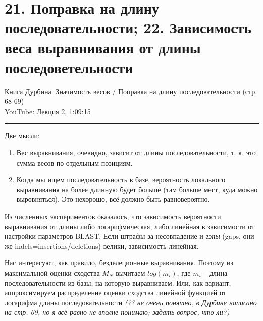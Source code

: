 \documentclass[a4paper,12pt]{article} %
\begin{document}
\section{21. Поправка на длину последовательности; 22. Зависимость веса выравнивания от длины последоветельности}
Книга Дурбина.  Значимость весов / Поправка на длину последовательности (стр. 68-69) \\
YouTube: \href{https://youtu.be/gGoYQBBEX8M?t=4155}{Лекция 2, 1:09:15}
\hrule \vspace{10pt}
Две мысли:
\begin{enumerate}
	\item Вес выравнивания, очевидно, зависит от длины последовательности, т. к. это сумма весов по отдельным позициям.
	\item Когда мы ищем последовательность в базе, вероятность локального выравнивания на более длинную будет больше (там больше мест, куда можно выровняться). Это нехорошо, всё должно быть равновероятно.
\end{enumerate}
Из численных экспериментов оказалось, что зависимость вероятности выравнивания от длины либо логарифмическая, либо линейная в зависимости от настройки параметров BLAST. Если штрафы за несовпадение и \textit{гэпы} (gaps, они же indels=insertions/deletions) велики, зависимость линейная.

Нас интересуют, как правило, безделеционные выравнивания. Поэтому из максимальной оценки сходства $M_N$ вычитаем $log(m_i)$, где $m_i$ -- длина последовательности из базы, на которую выравниваем. Или, как вариант, аппроксимируем распределение оценки сходства линейной функцией от логарифма длины последовательности \textit{(?? не очень понятно, в Дурбине написано на стр. 69, но я всё равно не вполне понимаю; задать вопрос, что ли?)}
	
\end{document}
